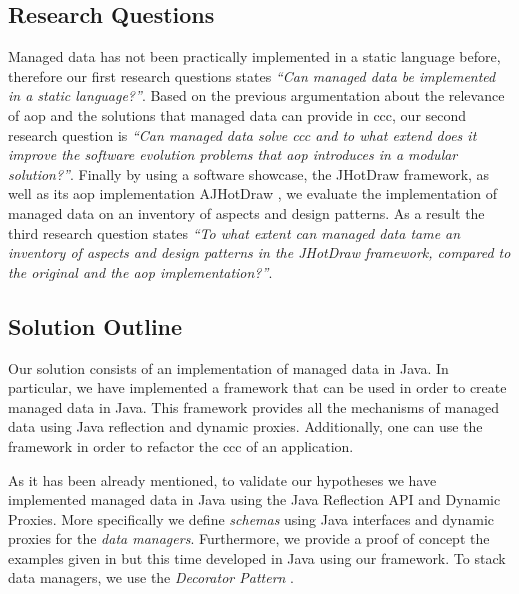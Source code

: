 \subsection{Research Questions}\label{Research Questions}
Managed data has not been practically implemented in a static language before, therefore our first research questions states 
\textit{``Can managed data be implemented in a static language?''}.
Based on the previous argumentation about the relevance of \ac{aop} and the solutions that managed data can provide in \acrlong{ccc}, our second research question is \textit{``Can managed data solve \ac{ccc} and to what extend does it improve the software evolution problems that \ac{aop} introduces in a modular solution?''}. 
Finally by using a software showcase, the JHotDraw framework, as well as its \ac{aop} implementation AJHotDraw \cite{marinajhotdraw}, 
we evaluate the implementation of managed data on an inventory of aspects and design patterns. 
As a result the third research question states \textit{``To what extent can managed data tame an inventory of aspects and design patterns in the JHotDraw framework, compared to the original and the \ac{aop} implementation?''}.

\subsection{Solution Outline}\label{Solution Outline}
Our solution consists of an implementation of managed data in Java. 
In particular, we have implemented a framework that can be used in order to create managed data in Java.
This framework provides all the mechanisms of managed data using Java reflection and dynamic proxies. Additionally, one can use the framework in order to refactor the \ac{ccc} of an application.

As it has been already mentioned, to validate our hypotheses we have implemented managed data in Java using the Java Reflection API and Dynamic Proxies. 
More specifically we define \textit{schemas} using Java interfaces and dynamic proxies for the \textit{data managers}. 
Furthermore, we provide a proof of concept the examples given in \cite{loh2012managed} but this time developed in Java using our framework. 
To stack data managers\cite{loh2012managed}, we use the \textit{Decorator Pattern} \cite{gamma1995design}. 

